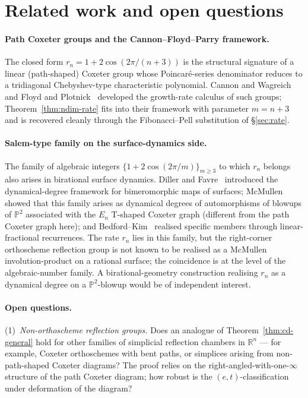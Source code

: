 \documentclass[11pt,a4paper]{article}
\theoremstyle{remark}
\theoremstyle{plain}
\begin{document}
\section{Related work and open questions}\label{sec:related}

\paragraph{Path Coxeter groups and the Cannon--Floyd--Parry framework.}
The closed form $r_n = 1 + 2\cos(2\pi/(n+3))$ is the structural
signature of a linear (path-shaped) Coxeter group whose
Poincar\'e-series denominator reduces to a tridiagonal Chebyshev-type
characteristic polynomial.  Cannon and Wagreich~\cite{cannon-wagreich}
and Floyd and Plotnick~\cite{floyd-plotnick} developed the
growth-rate calculus of such groups; Theorem~\ref{thm:ndim-rate}
fits into their framework with parameter $m = n + 3$ and is
recovered cleanly through the Fibonacci--Pell substitution of
\S\ref{sec:rate}.

\paragraph{Salem-type family on the surface-dynamics side.}
The family of algebraic integers $\{ 1 + 2 \cos(2\pi/m)\}_{m \ge 3}$
to which $r_n$ belongs also arises in birational surface dynamics.
Diller and Favre~\cite{diller-favre} introduced the
dynamical-degree framework for bimeromorphic maps of surfaces;
McMullen~\cite{mcmullen-2007} showed that this family arises as
dynamical degrees of automorphisms of blowups of $\mathbb{P}^2$
associated with the $E_n$ T-shaped Coxeter graph (different from
the path Coxeter graph here); and Bedford--Kim~\cite{bedford-kim}
realised specific members through linear-fractional recurrences.
The rate $r_n$ lies in this family, but the right-corner orthoscheme
reflection group is not known to be realised as a McMullen
involution-product on a rational surface; the coincidence is at
the level of the algebraic-number family.  A birational-geometry
construction realising $r_n$ as a dynamical degree on a
$\mathbb{P}^2$-blowup would be of independent interest.

\paragraph{Open questions.}
(1)~\emph{Non-orthoscheme reflection groups.}  Does an analogue of
Theorem~\ref{thm:cd-general} hold for other families of simplicial
reflection chambers in $\mathbb{R}^n$ --- for example, Coxeter
orthoschemes with bent paths, or simplices arising from
non-path-shaped Coxeter diagrams?  The proof relies on the
right-angled-with-one-$\infty$ structure of the path Coxeter
diagram; how robust is the $(e, t)$-classification under deformation
of the diagram?
\end{document}
